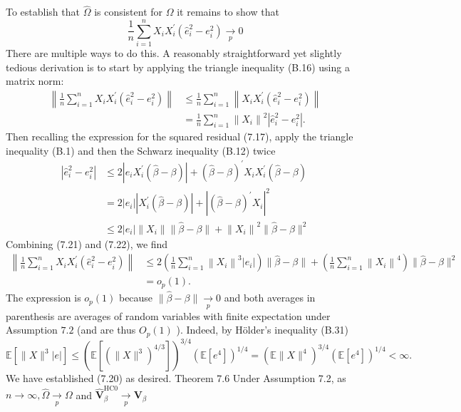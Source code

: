 \documentclass[10pt]{article}
\begin{document}
To establish that $\widehat{\Omega}$ is consistent for $\Omega$ it remains to show that
$$
\frac{1}{n} \sum_{i=1}^{n} X_{i} X_{i}^{\prime}\left(\widehat{e}_{i}^{2}-e_{i}^{2}\right) \underset{p}{\longrightarrow} 0
$$
There are multiple ways to do this. A reasonably straightforward yet slightly tedious derivation is to start by applying the triangle inequality (B.16) using a matrix norm:
$$
\begin{aligned}
\left\|\frac{1}{n} \sum_{i=1}^{n} X_{i} X_{i}^{\prime}\left(\widehat{e}_{i}^{2}-e_{i}^{2}\right)\right\| & \leq \frac{1}{n} \sum_{i=1}^{n}\left\|X_{i} X_{i}^{\prime}\left(\widehat{e}_{i}^{2}-e_{i}^{2}\right)\right\| \\
&=\frac{1}{n} \sum_{i=1}^{n}\left\|X_{i}\right\|^{2}\left|\widehat{e}_{i}^{2}-e_{i}^{2}\right| .
\end{aligned}
$$
Then recalling the expression for the squared residual (7.17), apply the triangle inequality (B.1) and then the Schwarz inequality (B.12) twice
$$
\begin{aligned}
\left|\widehat{e}_{i}^{2}-e_{i}^{2}\right| & \leq 2\left|e_{i} X_{i}^{\prime}(\widehat{\beta}-\beta)\right|+(\widehat{\beta}-\beta)^{\prime} X_{i} X_{i}^{\prime}(\widehat{\beta}-\beta) \\
&=2\left|e_{i}\right|\left|X_{i}^{\prime}(\widehat{\beta}-\beta)\right|+\left|(\widehat{\beta}-\beta)^{\prime} X_{i}\right|^{2} \\
& \leq 2\left|e_{i}\right|\left\|X_{i}\right\|\|\widehat{\beta}-\beta\|+\left\|X_{i}\right\|^{2}\|\widehat{\beta}-\beta\|^{2}
\end{aligned}
$$
Combining (7.21) and (7.22), we find
$$
\begin{aligned}
\left\|\frac{1}{n} \sum_{i=1}^{n} X_{i} X_{i}^{\prime}\left(\widehat{e}_{i}^{2}-e_{i}^{2}\right)\right\| & \leq 2\left(\frac{1}{n} \sum_{i=1}^{n}\left\|X_{i}\right\|^{3}\left|e_{i}\right|\right)\|\widehat{\beta}-\beta\|+\left(\frac{1}{n} \sum_{i=1}^{n}\left\|X_{i}\right\|^{4}\right)\|\widehat{\beta}-\beta\|^{2} \\
&=o_{p}(1) .
\end{aligned}
$$
The expression is $o_{p}(1)$ because $\|\widehat{\beta}-\beta\| \underset{p}{\longrightarrow} 0$ and both averages in parenthesis are averages of random variables with finite expectation under Assumption $7.2$ (and are thus $O_{p}(1)$ ). Indeed, by Hölder's inequality (B.31)
$$
\mathbb{E}\left[\|X\|^{3}|e|\right] \leq\left(\mathbb{E}\left[\left(\|X\|^{3}\right)^{4 / 3}\right]\right)^{3 / 4}\left(\mathbb{E}\left[e^{4}\right]\right)^{1 / 4}=\left(\mathbb{E}\|X\|^{4}\right)^{3 / 4}\left(\mathbb{E}\left[e^{4}\right]\right)^{1 / 4}<\infty .
$$
We have established (7.20) as desired. Theorem 7.6 Under Assumption 7.2, as $n \rightarrow \infty, \widehat{\Omega} \underset{p}{\longrightarrow} \Omega$ and $\widehat{\boldsymbol{V}}_{\beta}^{\mathrm{HC} 0} \underset{p}{\longrightarrow} \boldsymbol{V}_{\beta}$
\end{document}
